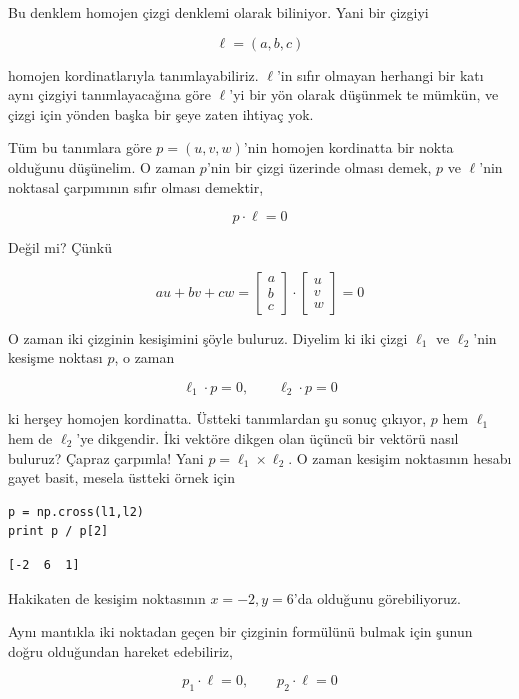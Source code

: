 \documentclass[12pt,fleqn]{article}\usepackage{../../common}
\begin{document}
Bu denklem homojen çizgi denklemi olarak biliniyor. Yani bir çizgiyi 

$$ \ell = (a,b,c)$$

homojen kordinatlarıyla tanımlayabiliriz. $\ell$'in sıfır olmayan herhangi
bir katı aynı çizgiyi tanımlayacağına göre $\ell$'yi bir yön olarak
düşünmek te mümkün, ve çizgi için yönden başka bir şeye zaten ihtiyaç yok.

Tüm bu tanımlara göre $p=(u,v,w)$'nin homojen kordinatta bir nokta olduğunu
düşünelim. O zaman $p$'nin bir çizgi üzerinde olması demek, $p$ ve
$\ell$'nin noktasal çarpımının sıfır olması demektir,

$$ p \cdot \ell = 0$$

Değil mi? Çünkü 

$$ 
au + bv + cw = 
\left[\begin{array}{r}
a \\ b \\ c
\end{array}\right] 
\cdot
\left[\begin{array}{r}
u \\ v \\ w
\end{array}\right] = 0
$$

O zaman iki çizginin kesişimini şöyle buluruz. Diyelim ki iki çizgi $\ell_1$
ve $\ell_2$'nin kesişme noktası $p$, o zaman

$$ \ell_1 \cdot p = 0, \qquad \ell_2 \cdot p = 0$$

ki herşey homojen kordinatta. Üstteki tanımlardan şu sonuç çıkıyor, $p$ hem
$\ell_1$ hem de $\ell_2$'ye dikgendir. İki vektöre dikgen olan üçüncü bir
vektörü nasıl buluruz? Çapraz çarpımla! Yani $p = \ell_1 \times \ell_2$. O
zaman kesişim noktasının hesabı gayet basit, mesela üstteki örnek için

\begin{verbatim}
p = np.cross(l1,l2) 
print p / p[2]
\end{verbatim}

\begin{verbatim}
[-2  6  1]
\end{verbatim}

Hakikaten de kesişim noktasının $x=-2,y=6$'da olduğunu görebiliyoruz. 

Aynı mantıkla iki noktadan geçen bir çizginin formülünü bulmak için şunun
doğru olduğundan hareket edebiliriz,

$$ p_1 \cdot \ell = 0, \qquad p_2 \cdot \ell = 0$$
\end{document}
